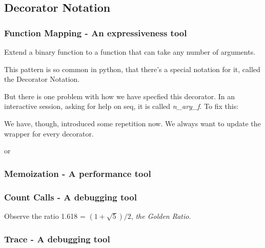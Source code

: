 \documentclass[12pt]{article}
\begin{document}
\subsection{Decorator Notation}

\subsubsection{Function Mapping - An expressiveness tool}

Extend a binary function to a function that can take any number of arguments.



This pattern is so common in python, that there's a special notation for it, called the Decorator Notation.



But there is one problem with how we have specfied this decorator. In an interactive session, asking for help on seq, it is called \emph{n\_ary\_f}. To fix this:



We have, though, introduced some repetition now. We always want to update the wrapper for every decorator.



or






\subsubsection{Memoization - A performance tool}






\subsubsection{Count Calls - A debugging tool}



Observe the ratio 1.618 = $(1+\sqrt{5})/2$, \emph{the Golden Ratio}.




\subsubsection{Trace - A debugging tool}
\end{document}
